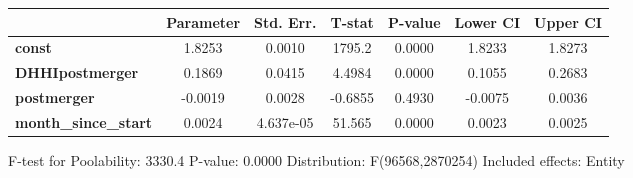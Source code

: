 \documentclass{report}
\begin{document}
\begin{center}
\begin{tabular}{lcccccc}
                             & \textbf{Parameter} & \textbf{Std. Err.} & \textbf{T-stat} & \textbf{P-value} & \textbf{Lower CI} & \textbf{Upper CI}  \\
\midrule
\textbf{const}               &       1.8253       &       0.0010       &      1795.2     &      0.0000      &       1.8233      &       1.8273       \\
\textbf{DHHIpostmerger}      &       0.1869       &       0.0415       &      4.4984     &      0.0000      &       0.1055      &       0.2683       \\
\textbf{postmerger}          &      -0.0019       &       0.0028       &     -0.6855     &      0.4930      &      -0.0075      &       0.0036       \\
\textbf{month\_since\_start} &       0.0024       &     4.637e-05      &      51.565     &      0.0000      &       0.0023      &       0.0025       \\
\bottomrule
\end{tabular}
\end{center}

F-test for Poolability: 3330.4 \newline
 P-value: 0.0000 \newline
 Distribution: F(96568,2870254) \newline
  \newline
 Included effects: Entity
\end{document}
